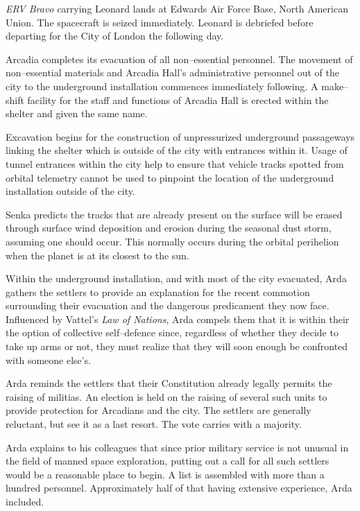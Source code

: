 {\it ERV Bravo} carrying Leonard lands at Edwards Air Force Base, North American Union. The spacecraft is seized immediately. Leonard is debriefed before departing for the City of London the following day.
\StopTimelineDate

Arcadia completes its evacuation of all non--essential personnel. The movement of non--essential materials and Arcadia Hall's administrative personnel out of the city to the underground installation commences immediately following. A make--shift facility for the staff and functions of Arcadia Hall is erected within the shelter and given the same name.

Excavation begins for the construction of unpressurized underground passageways linking the shelter which is outside of the city with entrances within it. Usage of tunnel entrances within the city help to ensure that vehicle tracks spotted from orbital telemetry cannot be used to pinpoint the location of the underground installation outside of the city. 

Senka predicts the tracks that are already present on the surface will be erased through surface wind deposition and erosion during the seasonal dust storm, assuming one should occur. This normally occurs during the orbital perihelion when the planet is at its closest to the sun.

Within the underground installation, and with most of the city evacuated, Arda gathers the settlers to provide an explanation for the recent commotion surrounding their evacuation and the dangerous predicament they now face. Influenced by Vattel's {\it Law of Nations}, Arda compels them that it is within their  the option of collective self--defence since, regardless of whether they decide to take up arms or not, they must realize that they will soon enough be confronted with someone else's.

Arda reminds the settlers that their Constitution already legally permits the raising of militias. An election is held on the raising of several such units to provide protection for  Arcadians and the city. The settlers are generally reluctant, but see it as a last resort. The vote carries with a majority.

Arda explains to his colleagues that since prior military service is not unusual in the field of manned space exploration, putting out a call for all such settlers would be a reasonable place to begin. A list is assembled with more than a hundred personnel. Approximately half of that having extensive experience, Arda included.
\StopTimelineDate


